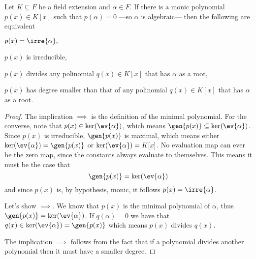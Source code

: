 \documentclass[12pt,oneside]{book}
\begin{document}
{\def\currentprefix{prop:characterisation of the minimal polynomial}
	\begin{proposition}\label{prop:characterisation of the minimal polynomial}
		Let \( K \subseteq F \) be a field extension and \( \alpha \in F \). If there is a monic
		polynomial \( p(x) \in K[x] \) such that \( p(\alpha) = 0 \) ---so \( \alpha \) is
		algebraic--- then the following are equivalent
		\begin{points}
		\item {} \( p(x) = \irre{\alpha}, \)
		\item {} \( p(x) \) is irreducible,
		\item {} \( p(x) \) divides any polinomial \( q(x) \in K[x] \) that has
			\( \alpha  \) as a root,
		\item {} \( p(x) \) has degree smaller than that of any polinomial \(
			q(x) \in K[x] \) that has	\( \alpha  \) as a root.
		\end{points}
	\end{proposition}
	\begin{proof}
		The implication \( \implies \) is the definition of the
		minimal polynomial. For the converse, note that \( p(x) \in \ker(\ev{\alpha}) \),
		which means \( \gen{p(x)} \subseteq \ker(\ev{\alpha}) \). Since \( p(x) \) is
		irreducible, \( \gen{p(x)} \) is maximal, which means either \( \ker(\ev{\alpha}) =
		\gen{p(x)} \) or \( \ker(\ev{\alpha}) = K[x] \). No evaluation map can ever be the
		zero map, since the constants always evaluate to themselves. This means it must be the
		case that
		\begin{equation*}
			\gen{p(x)} = \ker(\ev{\alpha})
		\end{equation*}
		and since \( p(x) \) is, by hypothesis, monic, it follows \( p(x) = \irre{\alpha} \).

		Let's show \( \implies \). We know that \( p(x) \) is the
		minimal polynomial of \( \alpha \), thus \( \gen{p(x)} = \ker(\ev{\alpha}) \). If \(
		q(\alpha) = 0 \) we have that \( q(x) \in \ker(\ev{\alpha}) = \gen{p(x)} \) which
		means \( p(x) \) divides \( q(x) \).

		The implication \( \implies \) follows from the fact that if a
		polynomial divides another polynomial then it must have a smaller degree.


\end{proof}}
\end{document}
